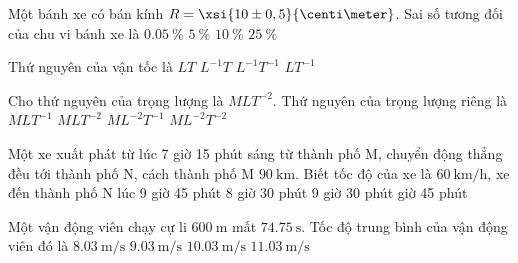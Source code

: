 \begin{ex}
	Một bánh xe có bán kính $R=\xsi{10\pm0,5}{\centi\meter}$. Sai số tương đối của chu vi bánh xe là
	\choice
	{$\SI{0.05}{\percent}$}
	{\True $\SI{5}{\percent}$}
	{$\SI{10}{\percent}$}
	{$\SI{25}{\percent}$}
\end{ex}
\begin{ex}
	Thứ nguyên của vận tốc là
	\choice
	{$LT$}
	{$L^{-1}T$}
	{$L^{-1}T^{-1}$}
	{\True $LT^{-1}$}
\end{ex}
\begin{ex}
	Cho thứ nguyên của trọng lượng là $MLT^{-2}$. Thứ nguyên của trọng lượng riêng là
	\choice
	{$MLT^{-1}$}
	{$MLT^{-2}$}
	{$ML^{-2}T^{-1}$}
	{\True $ML^{-2}T^{-2}$}
\end{ex}
\begin{ex}
Một xe xuất phát từ lúc 7 giờ 15 phút sáng từ thành phố M, chuyển động thẳng đều tới thành phố N, cách thành phố M $\SI{90}{\kilo\meter}$. Biết tốc độ của xe là $\SI{60}{\kilo\meter/\hour}$, xe đến thành phố N lúc	
	\choice
	{9 giờ 45 phút}
	{8 giờ 30 phút}
	{9 giờ 30 phút}
	{ giờ 45 phút}
\end{ex}
\begin{ex}
	Một vận động viên chạy cự li $\SI{600}{\meter}$ mất $\SI{74.75}{\second}$. Tốc độ trung bình của vận động viên đó là
	\choice
	{\True $\SI{8.03}{\meter/\second}$}
	{$\SI{9.03}{\meter/\second}$}
	{$\SI{10.03}{\meter/\second}$}
	{$\SI{11.03}{\meter/\second}$}
\end{ex}
